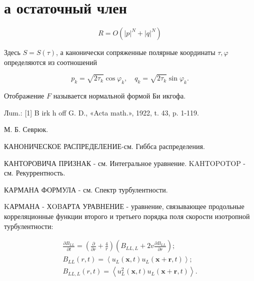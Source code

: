 \documentclass[10pt]{article}
\begin{document}
\section{а остаточный член}

\[

R=O\left(|p|^{N}+|q|^{N}\right)

\]



Здесь $S=S(\tau)$, а канонически сопряженные полярные координаты $\tau, \varphi$ определяются из соотношений



\[

p_{k}=\sqrt{2 \tau_{k}} \cos \varphi_{k}, \quad q_{k}=\sqrt{2 \tau_{k}} \sin \varphi_{k} .

\]



Отображение $F$ называется нормальной формой Би икгофа.



Лum.: [1] B irk h off G. D., «Acta math.», 1922, t. 43, p. 1-119.



М. Б. Севрюк.



КАНОНИЧЕСКОЕ РАСПРЕДЕЛЕНИЕ-см. Гиббса распределения.



КАНТОРОВИЧА ПРИЗНАК - см. Интегральное уравнение. KAHTOPOTOP - см. Рекуррентность.



КАРМАНА ФОРМУЛА - см. Спектр турбулентности.



KАРМАНА - ХOBАРТА УРАВНЕНИЕ - уравнение, связывающее продольные корреляционные функции второго и третьего порядка поля скорости изотропной турбулентности:



\[

\begin{gathered}

\frac{\partial B_{L L}}{\partial t}=\left(\frac{\partial}{\partial r}+\frac{4}{r}\right)\left(B_{L L, L}+2 v \frac{\partial B_{L L}}{\partial r}\right) ; \\

B_{L L}(r, t)=\left\langle u_{L}(\boldsymbol{x}, t) u_{L}(\boldsymbol{x}+\boldsymbol{r}, t)\right\rangle ; \\

B_{L L, L}(r, t)=\left\langle u_{L}^{2}(\boldsymbol{x}, t) u_{L}(\boldsymbol{x}+\boldsymbol{r}, t)\right\rangle .

\end{gathered}

\]
\end{document}
